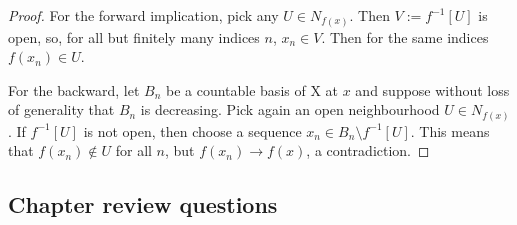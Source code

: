
\begin{proof} 
    For the forward implication, pick any \( U \in N_{f(x)} \). Then \( V := f^{-1}[U] \) is open, so, for all but finitely many indices \( n \), \( x_n \in V \). Then for the same indices \( f(x_n) \in U \).

    For the backward, let \( B_n \) be a countable basis of X at \( x \) and suppose without loss of generality that \( B_n \) is decreasing. Pick again an open neighbourhood \( U \in N_{f(x)} \). If \( f^{-1}[U] \) is not open, then choose a sequence \( x_n \in B_n \setminus f^{-1}[U] \). This means that \( f(x_n) \not\in U \) for all \( n \), but \( f(x_n) \to f(x) \), a contradiction.
\end{proof}

\subsection{Chapter review questions}

